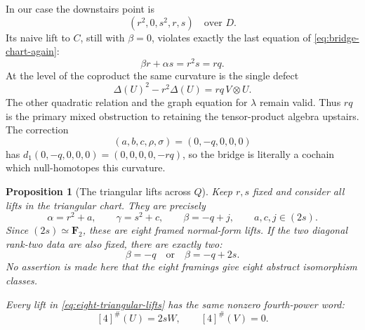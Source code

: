 \documentclass[11pt]{amsart}
\newtheorem{proposition}[theorem]{Proposition}
\theoremstyle{definition}
\theoremstyle{remark}
\newcommand{\F}{\mathbf F}
\newcommand{\ot}{\otimes}
\begin{document}
In our case the downstairs point is
\[
 (r^2,0,s^2,r,s)\quad\text{over }D.
\]
Its naive lift to \(C\), still with \(\beta=0\), violates exactly the last
equation of \eqref{eq:bridge-chart-again}:
\[
 \beta r+\alpha s=r^2s=rq.
\]
At the level of the coproduct the same curvature is the single defect
\begin{equation}\label{eq:naive-lift-curvature}
 \Delta(U)^2-r^2\Delta(U)=rq\,V\ot U.
\end{equation}
The other quadratic relation and the graph equation for \(\lambda\)
remain valid.  Thus \(rq\) is the primary mixed obstruction to retaining
the tensor-product algebra upstairs.  The correction
\[
 (a,b,c,\rho,\sigma)=(0,-q,0,0,0)
\]
has \(d_1(0,-q,0,0,0)=(0,0,0,0,-rq)\), so the bridge is literally a
cochain which null-homotopes this curvature.

\begin{proposition}[The triangular lifts across \(Q\)]
\label{prop:triangular-lifts}
Keep \(r,s\) fixed and consider all lifts in the triangular chart.  They
are precisely
\begin{equation}\label{eq:eight-triangular-lifts}
 \alpha=r^2+a,\qquad
 \gamma=s^2+c,\qquad
 \beta=-q+j,
 \qquad
 a,c,j\in(2s).
\end{equation}
Since \((2s)\simeq\F_2\), these are eight framed normal-form lifts.  If the
two diagonal rank-two data are also fixed, there are exactly two:
\[
 \beta=-q\quad\text{or}\quad \beta=-q+2s.
\]
No assertion is made here that the eight framings give eight abstract
isomorphism classes.

Every lift in \eqref{eq:eight-triangular-lifts} has the same nonzero
fourth-power word:
\begin{equation}\label{eq:all-lifts-same-carry}
 [4]^\#(U)=2sW,\qquad [4]^\#(V)=0.
\end{equation}
\end{proposition}
\end{document}
